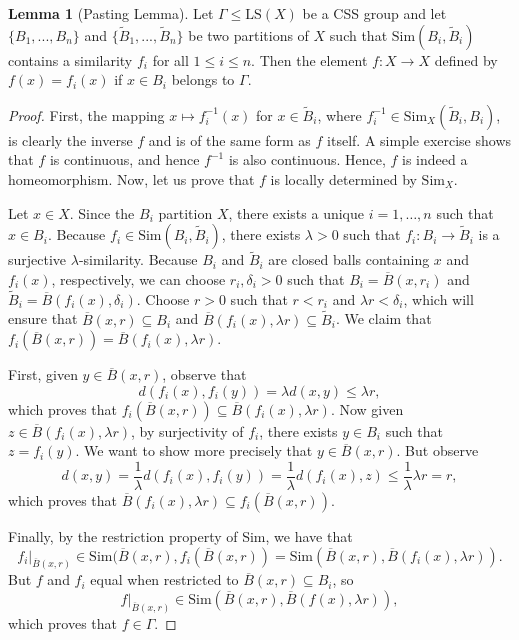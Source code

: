\documentclass[12pt]{amsart}
\numberwithin{equation}{subsection}
\theoremstyle{definition}
\newtheorem{lemma}[theorem]{Lemma}
\theoremstyle{definition}
\theoremstyle{remark}
\newcommand{\Sim}{\text{Sim}}
\begin{document}
\begin{lemma}[Pasting Lemma]\label{lemma:paste}
Let $\Gamma \leq \text{LS}(X)$ be a CSS group and let $\{B_1,...,B_n\}$ and $\{\widetilde{B}_1,...,\widetilde{B}_n\}$ be two partitions of $X$ such that $\text{Sim}(B_i,\widetilde{B}_i)$ contains a similarity $f_i$ for all $1 \leq i \leq n$. Then the element $f:X \to X$ defined by $f(x) = f_i(x)$ if $x \in B_i$ belongs to $\Gamma$.



\end{lemma}
\begin{proof}
First, the mapping $x \mapsto f_i^{-1}(x)$ for $x \in \widetilde{B}_{i}$, where $f_i^{-1} \in \text{Sim}_{X}(\widetilde{B}_{i}, B_i)$, is clearly the inverse $f$ and is of the same form as $f$ itself. A simple exercise shows that $f$ is continuous, and hence $f^{-1}$ is also continuous. Hence, $f$ is indeed a homeomorphism. Now, let us prove that $f$ is locally determined by $\text{Sim}_{X}$.

Let $x \in X$. Since the $B_i$ partition $X$, there exists a unique $i=1, \dots , n$ such that $x \in B_i$. Because $f_i \in \Sim(B_i, \widetilde{B}_{i})$, there exists $\lambda > 0$ such that $ f_i : B_i \to \widetilde{B}_{i}$ is a surjective $\lambda$-similarity. Because $B_i$ and $\widetilde{B}_{i}$ are closed balls containing $x$ and $f_i(x)$, respectively, we can choose $r_i , \delta_i > 0$ such that $B_i = \overline{B}(x,r_i)$ and $\widetilde{B}_{i} = \overline{B}(f_i(x), \delta_i)$. Choose $r > 0$ such that $r < r_i$ and $\lambda r < \delta_i$, which will ensure that $\overline{B}(x,r) \subseteq B_i$ and $\overline{B}(f_i(x) , \lambda r) \subseteq \widetilde{B}_{i}$. We claim that $f_i(\overline{B}(x,r)) = \overline{B}(f_i(x) , \lambda r)$. 

First, given $y \in \overline{B}(x,r)$, observe that $$d(f_i(x),f_i(y)) = \lambda d(x,y) \le \lambda r,$$ which proves that $f_i(\overline{B}(x,r)) \subseteq \overline{B}(f_i (x) , \lambda r)$. Now given $z \in \overline{B}(f_i (x) , \lambda r)$, by surjectivity of $f_i$, there exists $y \in B_i$ such that $z=f_i(y)$. We want to show more precisely that $y \in \overline{B}(x,r)$. But observe $$d(x,y) = \frac{1}{\lambda} d(f_i(x), f_i(y)) = \frac{1}{\lambda} d(f_i(x),z) \le \frac{1}{\lambda} \lambda r = r,$$
which proves that $\overline{B}(f_i(x) , \lambda r) \subseteq f_i(\overline{B}(x,r))$. 

Finally, by the restriction property of Sim, we have that $$f_i \vert_{\overline{B}(x,r)} \in \Sim(\overline{B}(x,r), f_i(\overline{B}(x,r)) = \Sim (\overline{B}(x,r), \overline{B}(f_i(x), \lambda r)).$$ But $f$ and $f_i$ equal when restricted to $\overline{B}(x,r) \subseteq B_i$, so $$f\vert_{\overline{B}(x,r)} \in \Sim (\overline{B}(x,r), \overline{B}(f(x), \lambda r)),$$ which proves that $f \in \Gamma$.

\end{proof}
\end{document}
